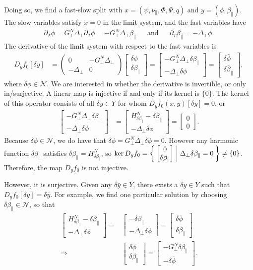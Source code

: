 \documentclass{article}
\newcommand{\para}{\parallel}
\newcommand{\lap}{\Delta_\perp}
\newcommand{\p}{\partial}
\newcommand{\GN}{G_\perp^N}
\newcommand{\bmat} [1] {\begin{bmatrix} #1 \end{bmatrix}}
\newcommand{\pmat} [1] {\begin{pmatrix} #1 \end{pmatrix}}
\begin{document}
Doing so, we find a fast-slow split with $x=(\psi, \nu_\para, \Phi, \Psi, q)$ and $y=(\phi, \beta_\para)$. The slow variables satisfy $\dot{x}=0$ in the limit system, and the fast variables have 
\begin{align*}
    \p_T\phi = \GN\lap\p_T\phi = -\GN\lap\beta_\para && \text{and} && \p_T \beta_\para = -\lap \phi. 
\end{align*}
The derivative of the limit system with respect to the fast variables is 
\begin{align}
    D_yf_0[\delta y] &= \pmat{0 & -\GN\lap \\ -\lap & 0} \bmat{\delta\phi \\ \delta\beta_\para} = \bmat{-\GN\lap\delta\beta_\para \\ -\lap\delta\phi} = \bmat{\delta\bar{\phi} \\ \delta\bar{\beta}_\para}, 
\end{align}
where $\delta\phi \in\mathcal{N}$. We are interested in whether the derivative is invertible, or only in/surjective. A linear map is injective if and only if its kernel is $\{0\}$. The kernel of this operator consists of all $\delta y\in Y$ for whom $D_yf_0(x,y)[\delta y] = 0$, or 
\begin{align}
    \bmat{-\GN\lap\delta\beta_\para \\ -\lap\delta\phi} &= 
    \bmat{H^N_{\delta\beta_\para} - \delta\beta_\para \\ -\lap\delta\phi} = 
    \bmat{0 \\ 0}. 
\end{align}
Because $\delta\phi\in\mathcal{N}$, we do have that $\delta\phi = \GN\lap\delta\phi = 0$. However any harmonic function $\delta\beta_\para$ satisfies $\delta\beta_\para = H^N_{\delta\beta_\para}$, so $\ker D_yf_0 = \Set{ \bmat{0 \\ \delta\beta_\para} | \lap \delta\beta_\para=0} \neq \{0\}$. Therefore, the map $D_yf_0$ is not injective. 

However, it is surjective. Given any $\delta\bar{y} \in Y$, there exists a $\delta y\in Y$ such that $D_yf_0[\delta y] = \delta\bar{y}$. For example, we find one particular solution by choosing $\delta\beta_\para\in\mathcal{N}$, so that  
\begin{align}
    \bmat{H^N_{\delta\beta_\para} - \delta\beta_\para \\ -\lap\delta\phi} =& \bmat{-\delta\beta_\para \\ -\lap\delta\phi} =  \bmat{\delta\bar{\phi} \\ \delta\bar{\beta}_\para} \\ 
    \Longrightarrow & \bmat{\delta\phi \\ \delta\beta_\para} = \bmat{-\GN \delta\bar{\beta}_\para \\ -\delta\bar{\phi}}. 
\end{align}
\end{document}
